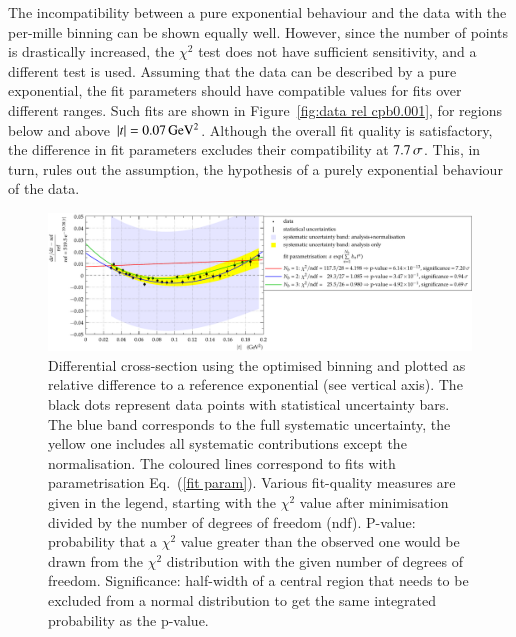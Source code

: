 
The incompatibility between a pure exponential behaviour and the data with the per-mille binning can be shown equally well. However, since the number of points is drastically increased, the $\chi^2$ test does not have sufficient sensitivity, and a different test is used. Assuming that the data can be described by a pure exponential, the fit parameters should have compatible values for fits over different ranges. Such fits are shown in Figure~\ref{fig:data rel cpb0.001}, for regions below and above $|t| = 0.07\,{\rm GeV^2}$. Although the overall fit quality is satisfactory, the difference in fit parameters excludes their compatibility at $7.7\,{\rm \sigma}$. This, in turn, rules out the assumption, the hypothesis of a purely exponential behaviour of the data.

\begin{figure}[t]
\vskip-5mm
\begin{center}
\includegraphics[width=\textwidth]{fig/t_dist_rel_with_fits.pdf}
\vskip-4mm
\caption{%
Differential cross-section using the optimised binning and plotted as relative difference to a reference exponential (see vertical axis). The black dots represent data points with statistical uncertainty bars. The blue band corresponds to the full systematic uncertainty, the yellow one includes all systematic contributions except the normalisation. The coloured lines correspond to fits with parametrisation Eq.~(\ref{fit param}).
Various fit-quality measures are given in the legend, starting with the $\chi^2$ value after minimisation divided by the number of degrees of freedom (ndf). P-value: probability that a $\chi^2$ value greater than the observed one would be drawn from the $\chi^2$ distribution with the given number of degrees of freedom. Significance: half-width of a central region that needs to be excluded from a normal distribution to get the same integrated probability as the p-value.
}
\label{fig:data rel ob}
\end{center}
\vskip-2mm
\end{figure}



